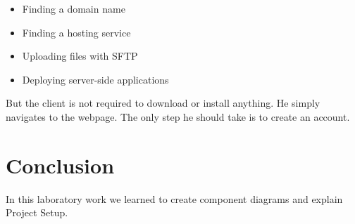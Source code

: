 \documentclass[12pt,a4paper,titlepage]{article}
\begin{document}
\begin{itemize}
	\item
	Finding a domain name
\item
	Finding a hosting service
\item
	Uploading files with SFTP
	\item 
	Deploying server-side applications
\end{itemize}

But the client is not required to download or install anything. He simply navigates to the webpage. The only step he should take is to create an account.

\section{Conclusion}
In this laboratory work we learned to create component diagrams and explain Project Setup.

\clearpage
\cleardoublepage
\end{document}
